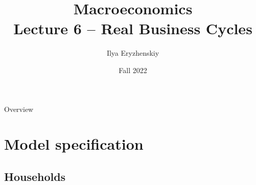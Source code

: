 \documentclass{beamer}
\title[PSME]{Macroeconomics\\ Lecture 6 -- Real Business Cycles}
\author[I. Eryzhenskiy]{Ilya Eryzhenskiy}
\institute[BdF]{PSME Panth\'{e}on-Sorbonne Master in Economics}
\date[PSME macro]{Fall 2022}
\begin{document}
\begin{frame}
  \maketitle
\end{frame}

\begin{frame}{Overview}
  \tableofcontents
\end{frame}


\section{Model specification}
\subsection{Households}
\end{document}
